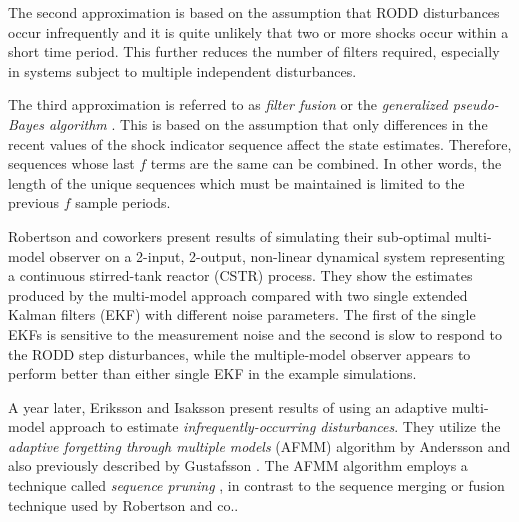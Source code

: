 The second approximation is based on the assumption that RODD disturbances occur infrequently and it is quite unlikely that two or more shocks occur within a short time period. This further reduces the number of filters required, especially in systems subject to multiple independent disturbances.

The third approximation is referred to as \textit{filter fusion} or the \textit{generalized pseudo-Bayes algorithm} \cite{jaffer_estimation_1971, buxbaum_recursive_1970, tugnait_detection_1982}. This is based on the assumption that only differences in the recent values of the shock indicator sequence affect the state estimates. Therefore, sequences whose last $f$ terms are the same can be combined. In other words, the length of the unique sequences which must be maintained is limited to the previous $f$ sample periods.

Robertson and coworkers present results of simulating their sub-optimal multi-model observer on a 2-input, 2-output, non-linear dynamical system representing a continuous stirred-tank reactor (CSTR) process. They show the estimates produced by the multi-model approach compared with two single extended Kalman filters (EKF) with different noise parameters. The first of the single EKFs is sensitive to the measurement noise and the second is slow to respond to the RODD step disturbances, while the multiple-model observer appears to perform better than either single EKF in the example simulations.

A year later, Eriksson and Isaksson \cite{eriksson_classification_1996} present results of using an adaptive multi-model approach to estimate \textit{infrequently-occurring disturbances}. They utilize the \textit{adaptive forgetting through multiple models} (AFMM) algorithm by Andersson \cite{andersson_adaptive_1985} and also previously described by Gustafsson \cite{gustafsson_estimation_1993}. The AFMM algorithm employs a technique called \textit{sequence pruning} \cite{tugnait_detection_1982}, in contrast to the sequence merging or fusion technique used by Robertson and co.\cite{blom_interacting_1988}.

